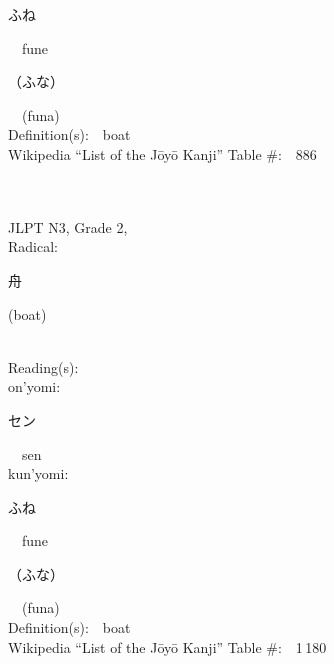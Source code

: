 \begin{multicols}{2}
{\hspace*{2em}}{\begin{CJK}{UTF8}{min} ふね \end{CJK}}\ \ fune\ \ \\
{\hspace*{2em}}{\begin{CJK}{UTF8}{min} （ふな） \end{CJK}}\ \ (funa)\ \ \\
Definition(s):\ \ boat \\
Wikipedia ``List of the J\=oy\=o Kanji'' Table \#:\ \ 886 \\
\ \ \\
{\fontsize{34pt}{40pt}  }\ \ \\  %
{JLPT N3, Grade 2, \\Radical:\ \ {\begin{CJK}{UTF8}{min} 舟 \end{CJK}} (boat) } \\
Reading(s):\ \ \\
{\hspace*{1em}}on'yomi:\ \ \\
{\hspace*{2em}}{\begin{CJK}{UTF8}{min} セン \end{CJK}}\ \ sen\ \ \\
{\hspace*{1em}}kun'yomi:\ \ \\
{\hspace*{2em}}{\begin{CJK}{UTF8}{min} ふね \end{CJK}}\ \ fune\ \ \\
{\hspace*{2em}}{\begin{CJK}{UTF8}{min} （ふな） \end{CJK}}\ \ (funa)\ \ \\
Definition(s):\ \ boat \\
Wikipedia ``List of the J\=oy\=o Kanji'' Table \#:\ \ 1\,180 \\
\ \ \\
{\fontsize{34pt}{40pt}  }\ \ \\  %

\end{multicols}
